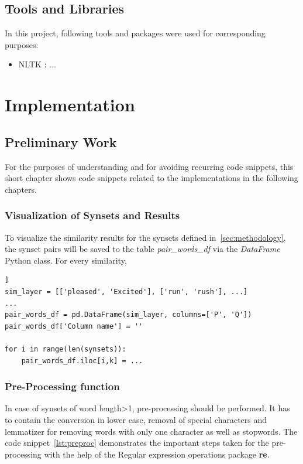 \documentclass[conference]{IEEEtran}
\begin{document}
\subsection{Tools and Libraries}
In this project, following tools and packages were used for corresponding purposes:
\begin{itemize}
\item NLTK : ...
\end{itemize}

\section{Implementation}\label{sec:implementation}

\subsection{Preliminary Work}
For the purposes of understanding and for avoiding recurring code snippets, this short chapter shows code snippets related to the implementations in the following chapters.

\subsubsection{Visualization of Synsets and Results}

To visualize the similarity results for the synsets defined in~\ref{sec:methodology}, the synset pairs will be saved to the table \textit{pair\_words\_df} via the \textit{DataFrame} Python class. For every similarity, 

\begin{lstlisting}[frame=single, label=lst:table, caption={}, captionpos=b]]
sim_layer = [['pleased', 'Excited'], ['run', 'rush'], ...]
...
pair_words_df = pd.DataFrame(sim_layer, columns=['P', 'Q'])
pair_words_df['Column name'] = ''

for i in range(len(synsets)):
    pair_words_df.iloc[i,k] = ...
\end{lstlisting}

\subsubsection{Pre-Processing function}\label{sec:preproc}

In case of synsets of word length>1,  pre-processing should be performed. It has to contain the conversion in lower case, removal of special characters and lemmatizer for removing words with only one character as well as stopwords. The code snippet~\ref{lst:preproc} demonstrates the important steps taken for the pre-processing with the help of the Regular expression operations package \textbf{re}.
\end{document}
